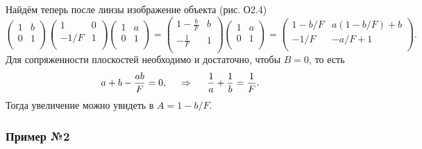 Найдём теперь после линзы изображение объекта (рис. О2.4)
\begin{equation*}
    \begin{pmatrix}
        1 & b \\
        0 & 1 \\
    \end{pmatrix}
    \begin{pmatrix}
        1 & 0 \\
        -1/F & 1 \\
    \end{pmatrix}
    \begin{pmatrix}
        1 & a \\
        0 & 1 \\
    \end{pmatrix}
    =
    \begin{pmatrix}
        1- \frac{b}{F} & b \\
        -\frac{1}{F} & 1 \\
    \end{pmatrix}
    \begin{pmatrix}
        1 & a \\
        0 & 1 \\
    \end{pmatrix} = 
    \begin{pmatrix}
        1-b/F & a(1-b/F)+b \\
        -1/F & -a/F + 1 \\
    \end{pmatrix}.
\end{equation*}
Для сопряженности плоскостей необходимо и достаточно, чтобы $B=0$, то есть
\begin{equation*}
    a + b - \frac{ab}{F} = 0,
    \hspace{0.5cm} \Rightarrow \hspace{0.5cm}
    \frac{1}{a}  +\frac{1}{b} = \frac{1}{F}.
\end{equation*}
Тогда увеличение можно увидеть в $A = 1-b/F$.




\subsubsection*{Пример №2}

